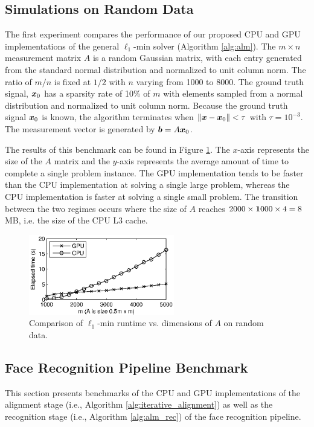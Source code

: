 \documentclass[preprint]{sigplanconf}
\begin{document}
\subsection{Simulations on Random Data}
\label{sec:simulation}

The first experiment compares the performance of our proposed CPU and GPU
implementations of the general $\ell_1$-min solver (Algorithm \eqref{alg:alm}).
The $m \times n$ measurement matrix $A$ is a random Gaussian matrix, with each
entry generated from the standard normal distribution and normalized to unit
column norm.  The ratio of $m/n$ is fixed at $1/2$ with $n$ varying from 1000 to 8000.
The ground truth signal, ${\boldsymbol{x}}_0$ has a sparsity rate of 10\% of $m$ with
elements sampled from a normal distribution and normalized to unit column
norm.  Because the ground truth signal ${\boldsymbol{x}}_0$ is known, the algorithm
terminates when $\|{\boldsymbol x}-{\boldsymbol x}_0\| < \tau$ with $\tau=10^{-3}$.  The measurement
vector is generated by ${\boldsymbol{b}} = A {\boldsymbol{x}}_0$.   

The results of this benchmark can be found in Figure \ref{fig:random_data}.
The $x$-axis represents the size of the $A$ matrix and the $y$-axis represents the
average amount of time to complete a single problem instance.  The GPU
implementation tends to be faster than the CPU implementation at solving a
single large problem, whereas the CPU implementation is faster at solving a
single small problem.  The transition between the two regimes occurs where the size of
$A$ reaches $2000 \times {\boldsymbol{1}}000 \times 4 = 8$ MB, i.e. the size of the CPU L3 cache. 
\begin{figure}
\begin{center}
\includegraphics[width=2.5in]{figures/time_vs_matrix_size_constant_tol}
\end{center} \vspace{-0.1in}
\caption{\small Comparison of $\ell_1$-min runtime vs. dimensions of $A$ on random data.} \vspace{-0.1in}
\label{fig:random_data}
\end{figure}

\subsection{Face Recognition Pipeline Benchmark} \vspace{-0.06in}
\label{sec:benchmark}
This section presents benchmarks of the CPU and GPU implementations of the
alignment stage (i.e., Algorithm
\ref{alg:iterative_alignment}) as well as the recognition stage (i.e., Algorithm \ref{alg:alm_rec}) of the
face recognition pipeline.
\end{document}

